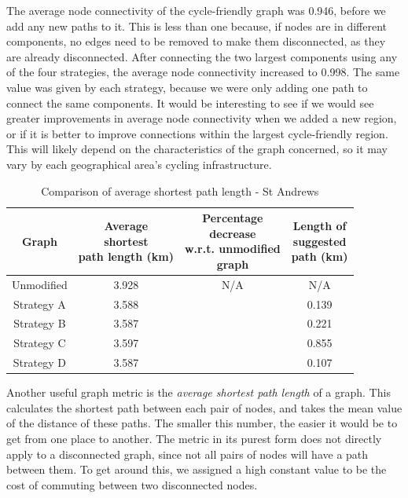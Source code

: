 \documentclass[12pt,a4paper]{report}
\begin{document}
The average node connectivity of the cycle-friendly graph was 0.946, before we add any new paths to it. This is less than one because, if nodes are in different components, no edges need to be removed to make them disconnected, as they are already disconnected. After connecting the two largest components using any of the four strategies, the average node connectivity increased to 0.998. The same value was given by each strategy, because we were only adding one path to connect the same components. It would be interesting to see if we would see greater improvements in average node connectivity when we added a new region, or if it is better to improve connections within the largest cycle-friendly region. This will likely depend on the characteristics of the graph concerned, so it may vary by each geographical area's cycling infrastructure.

\begin{table}[ht]
    \centering
    \begin{tabular}{|c|c|c|c|}
        \hline
        Graph & \makecell{Average \\shortest \\path length (km)} & \makecell{Percentage \\decrease \\w.r.t. unmodified \\graph} & \makecell{Length of \\suggested \\path (km)}\\ 
        \hline
        Unmodified & 3.928 & N/A & N/A\\
        Strategy A & 3.588 &  & 0.139\\
        Strategy B & 3.587 &  & 0.221\\
        Strategy C & 3.597 &  & 0.855\\
        Strategy D & 3.587 &  & 0.107\\
        \hline
    \end{tabular}
    \caption{Comparison of average shortest path length - St Andrews}
    \label{tab:avg st andrews}
\end{table}

Another useful graph metric is the \textit{average shortest path length} of a graph. This calculates the shortest path between each pair of nodes, and takes the mean value of the distance of these paths. The smaller this number, the easier it would be to get from one place to another. The metric in its purest form does not directly apply to a disconnected graph, since not all pairs of nodes will have a path between them. To get around this, we assigned a high constant value to be the cost of commuting between two disconnected nodes. 
\end{document}
